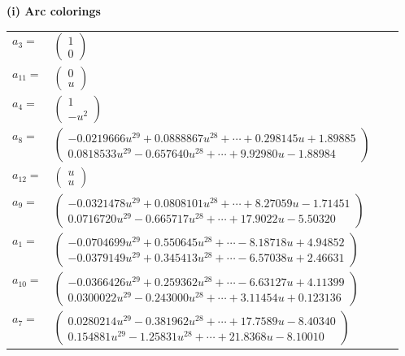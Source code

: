 \documentclass[1p]{elsarticle_modified}
\theoremstyle{definition}
\begin{document}
\flushleft \textbf{(i) Arc colorings}\\
\begin{tabular}{m{7pt} m{180pt} m{7pt} m{180pt} }
\flushright $a_{3}=$&$\begin{pmatrix}1\\0\end{pmatrix}$ \\
\flushright $a_{11}=$&$\begin{pmatrix}0\\u\end{pmatrix}$ \\
\flushright $a_{4}=$&$\begin{pmatrix}1\\- u^2\end{pmatrix}$ \\
\flushright $a_{8}=$&$\begin{pmatrix}-0.0219666 u^{29}+0.0888867 u^{28}+\cdots+0.298145 u+1.89885\\0.0818533 u^{29}-0.657640 u^{28}+\cdots+9.92980 u-1.88984\end{pmatrix}$ \\
\flushright $a_{12}=$&$\begin{pmatrix}u\\u\end{pmatrix}$ \\
\flushright $a_{9}=$&$\begin{pmatrix}-0.0321478 u^{29}+0.0808101 u^{28}+\cdots+8.27059 u-1.71451\\0.0716720 u^{29}-0.665717 u^{28}+\cdots+17.9022 u-5.50320\end{pmatrix}$ \\
\flushright $a_{1}=$&$\begin{pmatrix}-0.0704699 u^{29}+0.550645 u^{28}+\cdots-8.18718 u+4.94852\\-0.0379149 u^{29}+0.345413 u^{28}+\cdots-6.57038 u+2.46631\end{pmatrix}$ \\
\flushright $a_{10}=$&$\begin{pmatrix}-0.0366426 u^{29}+0.259362 u^{28}+\cdots-6.63127 u+4.11399\\0.0300022 u^{29}-0.243000 u^{28}+\cdots+3.11454 u+0.123136\end{pmatrix}$ \\
\flushright $a_{7}=$&$\begin{pmatrix}0.0280214 u^{29}-0.381962 u^{28}+\cdots+17.7589 u-8.40340\\0.154881 u^{29}-1.25831 u^{28}+\cdots+21.8368 u-8.10010\end{pmatrix}$ \\

\end{tabular}
\end{document}
